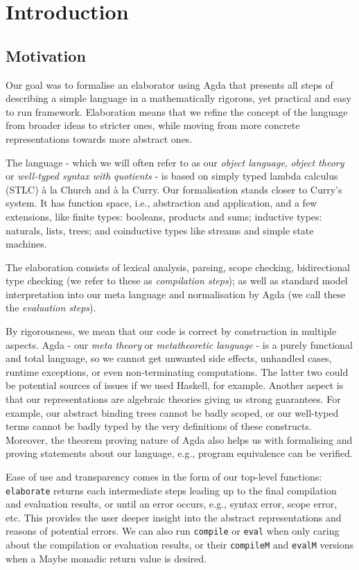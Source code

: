 \chapter{Introduction}
\label{ch:intro}

\section{Motivation}

Our goal was to formalise an elaborator using Agda that presents all steps of describing a simple language in a mathematically rigorous, yet practical and easy to run framework. Elaboration means that we refine the concept of the language from broader ideas to stricter ones, while moving from more concrete representations towards more abstract ones.

The language - which we will often refer to as our \textit{object language}, \textit{object theory} or \textit{well-typed syntax with quotients} - is based on simply typed lambda calculus (STLC) à la Church and à la Curry. Our formalisation stands closer to Curry's system. It has function space, i.e., abstraction and application, and a few extensions, like finite types: booleans, products and sums; inductive types: naturals, lists, trees; and coinductive types like streams and simple state machines.

The elaboration consists of lexical analysis, parsing, scope checking, bidirectional type checking (we refer to these as \textit{compilation steps}); as well as standard model interpretation into our meta language and normalisation by Agda (we call these the \textit{evaluation steps}).

By rigorousness, we mean that our code is correct by construction in multiple aspects. Agda - our \textit{meta theory} or \textit{metatheoretic language} - is a purely functional and total language, so we cannot get unwanted side effects, unhandled cases, runtime exceptions, or even non-terminating computations. The latter two could be potential sources of issues if we used Haskell, for example. Another aspect is that our representations are algebraic theories giving us strong guarantees. For example, our abstract binding trees cannot be badly scoped, or our well-typed terms cannot be badly typed by the very definitions of these constructs. Moreover, the theorem proving nature of Agda also helps us with formalising and proving statements about our language, e.g., program equivalence can be verified.

Ease of use and transparency comes in the form of our top-level functions: \verb$elaborate$ returns each intermediate steps leading up to the final compilation and evaluation results, or until an error occurs, e.g., syntax error, scope error, etc. This provides the user deeper insight into the abstract representations and reasons of potential errors. We can also run \verb$compile$ or \verb$eval$ when only caring about the compilation or evaluation results, or their \verb$compileM$ and \verb$evalM$ versions when a Maybe monadic return value is desired.

